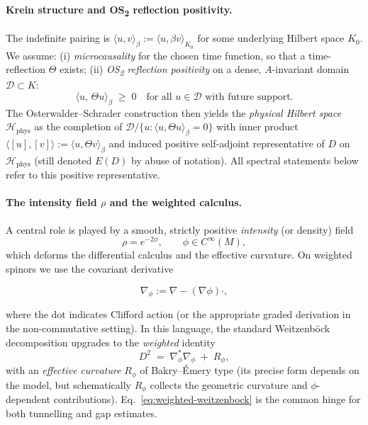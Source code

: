 \documentclass[11pt]{article}
\theoremstyle{definition}
\begin{document}
    \paragraph{Krein structure and OS\textsubscript{2} reflection positivity.}
    The indefinite pairing is $\langle u,v\rangle_\beta:=\langle u,\beta v\rangle_{K_0}$ for some underlying Hilbert space $K_0$.
    We assume: (i) \emph{microcausality} for the chosen time function, so that a time-reflection $\Theta$ exists; (ii) \emph{OS\textsubscript{2} reflection positivity} on a dense, $A$-invariant domain $\mathcal{D}\subset K$:
    \[
    \langle u,\,\Theta u\rangle_\beta \;\ge\; 0\quad\text{for all }u\in\mathcal{D}\text{ with future support}.
    \]
    The Osterwalder--Schrader construction then yields the \emph{physical Hilbert space} $\mathcal{H}_{\mathrm{phys}}$ as the completion of $\mathcal{D}/\{u:\langle u,\Theta u\rangle_\beta=0\}$ with inner product $\langle[u],[v]\rangle:=\langle u,\Theta v\rangle_\beta$ and induced positive self-adjoint representative of $D$ on $\mathcal{H}_{\mathrm{phys}}$ (still denoted $E(D)$ by abuse of notation). All spectral statements below refer to this positive representative.
    
    \paragraph{The intensity field $\rho$ and the weighted calculus.}
    A central role is played by a smooth, strictly positive \emph{intensity} (or density) field
    \[
    \rho = e^{-2\phi}\!,\qquad \phi\in C^\infty(M),
    \]
    which deforms the differential calculus and the effective curvature.
    On weighted spinors we use the covariant derivative
    
    \[
    \nabla_\phi := \nabla - (\nabla\phi)\cdot,
    \]
    
    where the dot indicates Clifford action (or the appropriate graded derivation in the non-commutative setting).
    In this language, the standard Weitzenböck decomposition upgrades to the \emph{weighted} identity
    \begin{equation}\label{eq:weighted-weitzenbock}
    	D^2 \;=\; \nabla_\phi^\ast\nabla_\phi \;+\; R_\phi,
    \end{equation}
    with an \emph{effective curvature} $R_\phi$ of Bakry--Émery type (its precise form depends on the model, but schematically $R_\phi$ collects the geometric curvature and $\phi$-dependent contributions). Eq.~\eqref{eq:weighted-weitzenbock} is the common hinge for both tunnelling and gap estimates.
    
\end{document}

